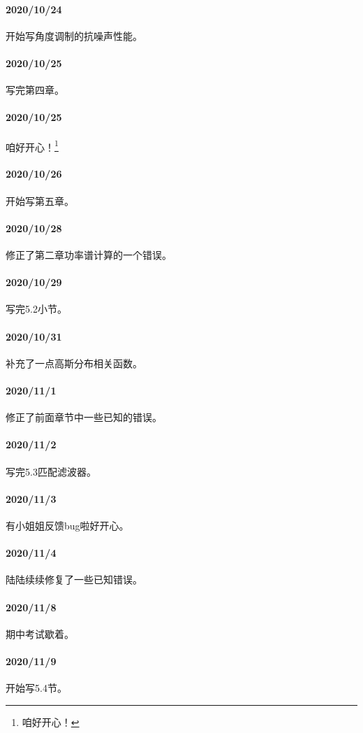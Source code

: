     \paragraph{2020/10/24}开始写角度调制的抗噪声性能。
    \paragraph{2020/10/25}写完第四章。
    \paragraph{2020/10/25}咱好开心！\footnote{咱好开心！}
    \paragraph{2020/10/26}开始写第五章。
    \paragraph{2020/10/28}修正了第二章功率谱计算的一个错误。
    \paragraph{2020/10/29}写完5.2小节。
    \paragraph{2020/10/31}补充了一点高斯分布相关函数。
    \paragraph{2020/11/1}修正了前面章节中一些已知的错误。
    \paragraph{2020/11/2}写完5.3匹配滤波器。
    \paragraph{2020/11/3}有小姐姐反馈bug啦好开心。
    \paragraph{2020/11/4}陆陆续续修复了一些已知错误。
    \paragraph{2020/11/8}期中考试歇着。
    \paragraph{2020/11/9}开始写5.4节。
